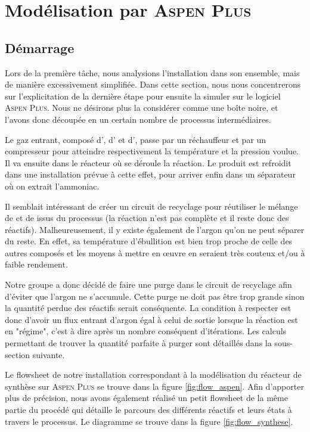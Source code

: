 \section{Modélisation par \textsc{Aspen Plus}}
\subsection{Démarrage}

Lors de la première tâche, nous analysions l'installation dans son ensemble, 
mais de manière excessivement simplifiée. 
Dans cette section, nous nous concentrerons sur l'explicitation de la dernière étape 
pour ensuite la simuler sur le logiciel \textsc{Aspen Plus}. 
Nous ne désirons plus la considérer comme une boîte noire, et l'avons donc découpée 
en un certain nombre de processus intermédiaires. 

Le gaz entrant, composé d', d' et d', passe par un réchauffeur 
et par un compresseur pour atteindre respectivement la température et la pression voulue. 
Il va ensuite dans le réacteur où se déroule la réaction.
Le produit est refroidit dans une installation prévue à cette effet, 
pour arriver enfin dans un séparateur où on extrait l'ammoniac.

Il semblait intéressant de créer un circuit de recyclage pour réutiliser 
le mélange de  et de  issus du processus (la réaction n'est pas complète 
et il reste donc des réactifs). Malheureusement, il y existe également de l'argon 
qu'on ne peut séparer du reste. En effet, sa température d'ébullition est bien trop 
proche de celle des autres composés et les moyens à mettre en œuvre en seraient 
très couteux et/ou à faible rendement.

Notre groupe a donc décidé de faire une purge dans le circuit de recyclage afin d'éviter que l'argon ne s'accumule. Cette purge ne doit pas être trop grande sinon la quantité perdue des réactifs serait conséquente. 
La condition à respecter est donc d'avoir un flux entrant d'argon égal à celui de sortie lorsque la réaction est en "régime", c'est à dire après un nombre conséquent d'itérations. 
Les calculs permettant de trouver la quantité parfaite à purger 
sont détaillés dans la sous-section suivante.

Le flowsheet de notre installation correspondant à la modélisation 
du réacteur de synthèse sur \textsc{Aspen Plus} 
se trouve dans la figure \ref{fig:flow_aspen}.
Afin d'apporter plus de précision, nous avons également réalisé un petit 
flowsheet de la même partie du procédé qui détaille le parcours des 
différents réactifs et leurs états à travers le processus.
Le diagramme se trouve dans la figure \ref{fig:flow_synthese}.

